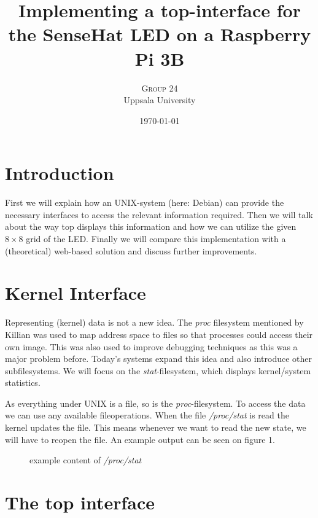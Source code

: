\documentclass[twoside,twocolumn]{article}
\title{Implementing a top-interface for the SenseHat LED on a Raspberry Pi 3B} %
\author{%
\textsc{Group 24} \\[1ex] %
\normalsize Uppsala University \\ %
}
\date{\today} %
\begin{document}
\maketitle


\section{Introduction}

First we will explain how an UNIX-system (here: Debian) can provide the 
necessary interfaces to access the relevant information required. Then we will 
talk about the way top displays this information and how we can utilize the 
given $8\times8$ grid of the LED. Finally we will compare this implementation
with a (theoretical) web-based solution and discuss further improvements. 


\section{Kernel Interface}

Representing (kernel) data is not a new idea. The \textit{proc} filesystem 
mentioned by Killian\cite{Killian:1984} was used to map address space to files 
so that processes could access their own image. This was also used to improve 
debugging techniques as this was a major problem before. Today's systems expand 
this idea and also introduce other subfilesystems\cite{proc(5)}. We will focus 
on the \textit{stat}-filesystem, which displays kernel/system statistics.

As everything under UNIX is a file, so is the \textit{proc}-filesystem. To
access the data we can use any available fileoperations. When the file
\textit{/proc/stat} is read the kernel updates the file. This means whenever we
want to read the new state, we will have to reopen the file. An example output
can be seen on figure 1. %

\begin{figure}[]
	\caption{example content of \textit{/proc/stat}}
\end{figure}

\section{The top interface}
\end{document}
